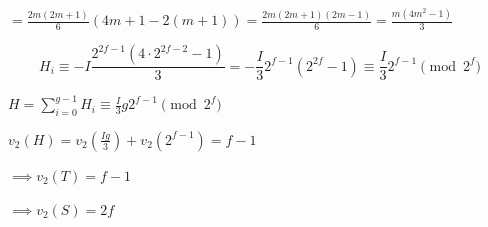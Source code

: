 \documentclass{article}
\begin{document}
\( = \frac{2m(2m+1)}{6}(4m+1 - 2(m+1)) = \frac{2m(2m+1)(2m-1)}{6} = \frac{m(4m^{2}-1)}{3} \)

\[ H_{i} \equiv -I \frac{2^{2f-1}(4 \cdot 2^{2f-2}-1)}{3} = -\frac{I}{3} 2^{f-1}(2^{2f} - 1) \equiv \frac{I}{3} 2^{f-1} \pmod{2^{f}} \]

\( H = \sum_{i=0}^{g-1} H_{i} \equiv \frac{I}{3}g 2^{f-1} \pmod{2^{f}} \)

\( v_{2}(H) = v_{2}(\frac{Ig}{3}) + v_{2}(2^{f-1}) = f - 1 \)

\( \implies v_{2}(T) = f-1 \)

\( \implies v_{2}(S) = 2f \)
\end{document}
